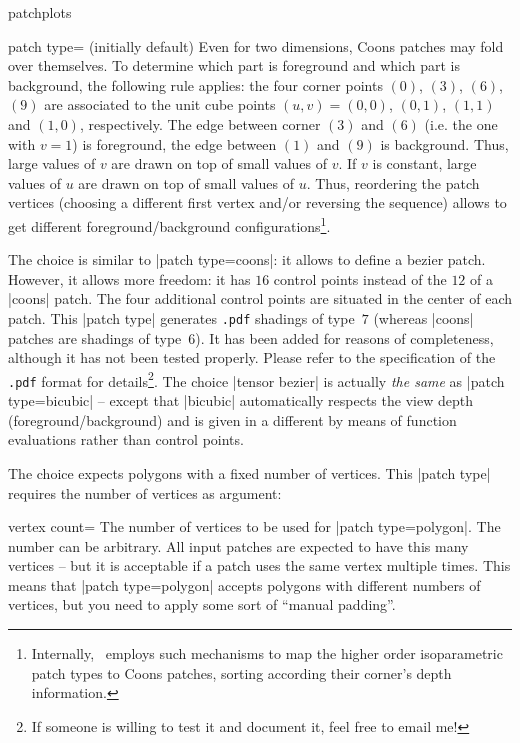 {\begin{pgfplotslibrary}{patchplots}
\begin{pgfplotskey}{patch type= (initially default)}
	Even for two dimensions, Coons patches may fold over themselves. To determine which part is foreground and which part is background, the following rule applies: the four corner points $(0)$, $(3)$, $(6)$, $(9)$ are associated to the unit cube points $(u,v) = (0,0)$, $(0,1)$, $(1,1)$ and $(1,0)$, respectively. The edge between corner $(3)$ and $(6)$ (i.e. the one with $v=1$) is foreground, the edge between $(1)$ and $(9)$ is background. Thus, large values of $v$ are drawn on top of small values of $v$. If $v$ is constant, large values of $u$ are drawn on top of small values of $u$. Thus, reordering the patch vertices (choosing a different first vertex and/or reversing the sequence) allows to get different foreground/background configurations\footnote{Internally, \PGFPlots\ employs such mechanisms to map the higher order isoparametric patch types to Coons patches, sorting according their corner's depth information.}.

	The choice  is similar to |patch type=coons|: it allows to define a bezier patch. However, it allows more freedom: it has $16$ control points instead of the $12$ of a |coons| patch. The four additional control points are situated in the center of each patch. This |patch type| generates \texttt{.pdf} shadings of type~$7$ (whereas |coons| patches are shadings of type~$6$). It has been added for reasons of completeness, although it has not been tested properly. Please refer to the specification of the \texttt{.pdf} format for details\footnote{If someone is willing to test it and document it, feel free to email me!}. The choice |tensor bezier| is actually \emph{the same} as |patch type=bicubic| -- except that |bicubic| automatically respects the view depth (foreground/background) and is given in a different by means of function evaluations rather than control points.
	

	The choice  expects polygons with a fixed number of vertices. This |patch type| requires the number of vertices as argument:
	\begin{pgfplotskey}{vertex count=}
		The number of vertices to be used for |patch type=polygon|. The number can be arbitrary. All input patches are expected to have this many vertices -- but it is acceptable if a patch uses the same vertex multiple times. This means that |patch type=polygon| accepts polygons with different numbers of vertices, but you need to apply some sort of ``manual padding''.
		

\end{pgfplotskey}
\end{pgfplotskey}
\end{pgfplotslibrary}}
